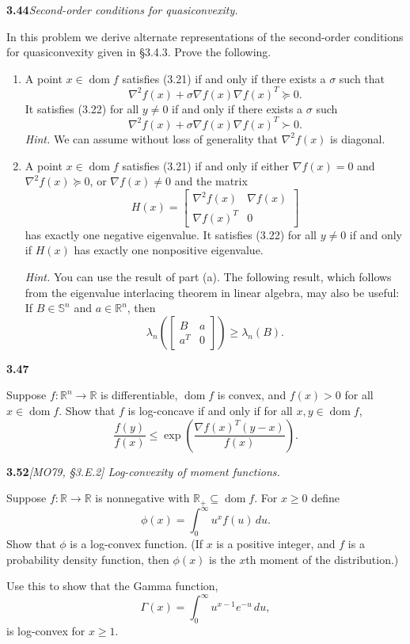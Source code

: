 \documentclass[11pt,a4paper]{article}
\newcommand{\R}{\mathbb{R}}
\newcommand{\dom}{\operatorname{dom}}
\newcommand{\ex}[2]{%
  \Needspace{5\baselineskip}%
  \par\medskip\noindent\textbf{#1}\quad\textit{#2}\quad\ignorespaces
}
\begin{document}
\ex{3.44}{Second-order conditions for quasiconvexity.}
In this problem we derive alternate representations of the second-order
conditions for quasiconvexity given in \S3.4.3. Prove the following.
\begin{enumerate}
\item A point $x\in\dom f$ satisfies (3.21) if and only if there exists a $\sigma$
such that
\begin{equation}\tag{3.26}
  \nabla^2f(x)+\sigma\nabla f(x)\nabla f(x)^T\succeq0.
\end{equation}
It satisfies (3.22) for all $y\neq0$ if and only if there exists a $\sigma$ such
\begin{equation}\tag{3.27}
  \nabla^2f(x)+\sigma\nabla f(x)\nabla f(x)^T\succ0.
\end{equation}
\textit{Hint.} We can assume without loss of generality that $\nabla^2f(x)$ is diagonal.
\item A point $x\in\dom f$ satisfies (3.21) if and only if either
$\nabla f(x)=0$ and $\nabla^2f(x)\succeq0$, or $\nabla f(x)\neq0$ and the matrix
\[
  H(x)=\begin{bmatrix}
    \nabla^2f(x)&\nabla f(x)\\
    \nabla f(x)^T&0
  \end{bmatrix}
\]
has exactly one negative eigenvalue. It satisfies (3.22) for all $y\neq0$
if and only if $H(x)$ has exactly one nonpositive eigenvalue.

\textit{Hint.} You can use the result of part (a). The following result, which
follows from the eigenvalue interlacing theorem in linear algebra, may also be
useful: If $B\in\mathbb{S}^n$ and $a\in\R^n$, then
\[
  \lambda_n\!\left(\begin{bmatrix}B&a\\a^T&0\end{bmatrix}\right)
  \geq\lambda_n(B).
\]
\end{enumerate}

\ex{3.47}{}
Suppose $f:\R^n\to\R$ is differentiable, $\dom f$ is convex, and
$f(x)>0$ for all $x\in\dom f$. Show that $f$ is log-concave if and only
if for all $x,y\in\dom f$,
\[
  \frac{f(y)}{f(x)}\leq
  \exp\!\left(\frac{\nabla f(x)^T(y-x)}{f(x)}\right).
\]

\ex{3.52}{[MO79, \S3.E.2] Log-convexity of moment functions.}
Suppose $f:\R\to\R$ is nonnegative with $\R_+\subseteq\dom f$.
For $x\geq0$ define
\[
  \phi(x)=\int_0^\infty u^x f(u)\,du.
\]
Show that $\phi$ is a log-convex function. (If $x$ is a positive integer,
and $f$ is a probability density function, then $\phi(x)$ is the $x$th moment
of the distribution.)

Use this to show that the Gamma function,
\[
  \Gamma(x)=\int_0^\infty u^{x-1}e^{-u}\,du,
\]
is log-convex for $x\geq1$.
\end{document}
